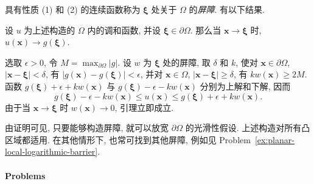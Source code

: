 具有性质 (1) 和 (2) 的连续函数称为 $\bm{\xi}$ 处关于 $\Omega$ 的\emph{屏障}. 有以下结果.

\begin{Lemma}
\label{lem:perron-boundary-continuity}
设 $u$ 为上述构造的 $\Omega$ 内的调和函数, 并设 $\bm{\xi}\in\partial\Omega$. 那么当 $\bm{x}\to\bm{\xi}$ 时, $u(\bm{x})\to g(\bm{\xi})$.
\end{Lemma}

\begin{Proof}
选取 $\epsilon>0$, 令 $M=\max_{\partial\Omega}|g|$. 设 $w$ 为 $\bm{\xi}$ 处的屏障, 取 $\delta$ 和 $k$, 使对 $\bm{x}\in\partial\Omega$, $|\bm{x}-\bm{\xi}|<\delta$, 有 $|g(\bm{x})-g(\bm{\xi})|<\epsilon$, 并对 $\bm{x}\in\Omega$, $|\bm{x}-\bm{\xi}|\geq\delta$, 有 $kw(\bm{x})\geq2M$. 函数 $g(\bm{\xi})+\epsilon+kw(\bm{x})$ 与 $g(\bm{\xi})-\epsilon-kw(\bm{x})$ 分别为上解和下解, 因而
\begin{equation}\label{eq:perron-barrier-boundary-comparison}
g(\bm{\xi})-\epsilon-kw(\bm{x})\leq u(\bm{x})\leq g(\bm{\xi})+\epsilon+kw(\bm{x}).
\end{equation}
由于当 $\bm{x}\to\bm{\xi}$ 时 $w(\bm{x})\to0$, 引理立即成立.
\end{Proof}

由证明可见, 只要能够构造屏障, 就可以放宽 $\partial\Omega$ 的光滑性假设. 上述构造对所有凸区域都适用. 在其他情形下, 也常可找到其他屏障, 例如见 Problem~\ref{ex:planar-local-logarithmic-barrier}.

\paragraph*{Problems}

